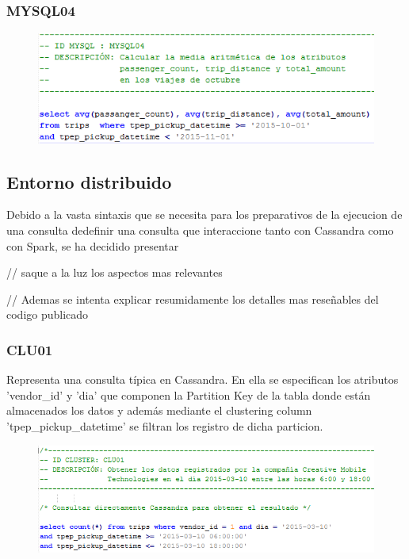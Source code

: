 \subsubsection[]{MYSQL04}

\begin{figure}[h]
	\centering
	\includegraphics[width=1\textwidth]{Ilustraciones/MYSQL04.png}
\end{figure}

\clearpage

\subsection{Entorno distribuido}

Debido a la vasta sintaxis que se necesita para los preparativos de la ejecucion de una consulta dedefinir una consulta que interaccione tanto con Cassandra como con Spark, se ha decidido presentar

// saque a la luz los aspectos mas relevantes

// Ademas se intenta explicar resumidamente los detalles mas reseñables del codigo publicado

\subsubsection[]{CLU01}

Representa una consulta típica en Cassandra. En ella se especifican los atributos 'vendor\_id' y 'dia' que componen la Partition Key de la tabla donde están almacenados los datos y además mediante el clustering column 'tpep\_pickup\_datetime' se filtran los registro de dicha particion.

\begin{figure}[h]
	\centering
	\includegraphics[width=1\textwidth]{Ilustraciones/CLU01.png}
\end{figure}

